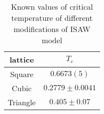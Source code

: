 \begin{table}[h]
    \centering
    \begin{tabular}{|c|c|}
        \hline
        lattice & $T_{c}$ \\ \hline
        Square & $0.6673(5)$ \cite{Caracciolo2011} \\ \hline
        Cubic & $0.2779 \pm 0.0041$\cite{Tesi1996} \\ \hline
        Triangle & $ 0.405 \pm 0.07$\cite{Privman1986} \\ \hline
    \end{tabular}

    \label{tab:ISAW_T_c}
    \medskip
    \caption{Known values of critical temperature of different modifications of ISAW model}
\end{table}